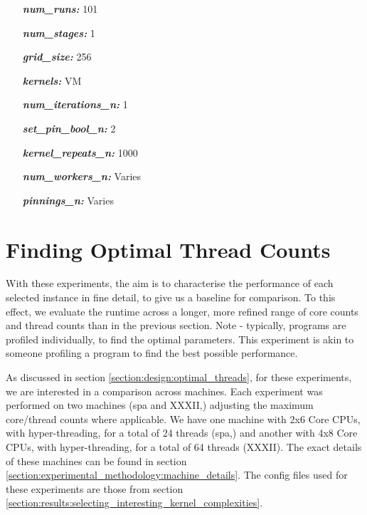 \begin{itemize}
    \begin{itemize}
        \item[\textit{\textbf{num\_runs:}}] 101
        
        \item[\textit{\textbf{num\_stages:}}] 1
        
        \item[\textit{\textbf{grid\_size:}}] 256
        
        \item[\textit{\textbf{kernels:}}] VM
        
        \item[\textit{\textbf{num\_iterations\_n:}}] 1
        
        \item[\textit{\textbf{set\_pin\_bool\_n:}}] 2
        
        \item[\textit{\textbf{kernel\_repeats\_n:}}] 1000
        
        \item[\textit{\textbf{num\_workers\_n:}}] Varies
        
        \item[\textit{\textbf{pinnings\_n:}}] Varies
    \end{itemize}
\end{itemize}



\section{Finding Optimal Thread Counts}
\label{section:results:finding_optimal_thread_counts}

With these experiments, the aim is to characterise the performance of each selected instance in fine detail, to give us a baseline for comparison. To this effect, we evaluate the runtime across a longer, more refined range of core counts and thread counts than in the previous section. Note - typically, programs are profiled individually, to find the optimal parameters. This experiment is akin to someone profiling a program to find the best possible performance.

As discussed in section \ref{section:design:optimal_threads}, for these experiments, we are interested in a comparison across machines. Each experiment was performed on two machines (spa and XXXII,) adjusting the maximum core/thread counts where applicable. We have one machine with 2x6 Core CPUs, with hyper-threading, for a total of 24 threads (spa,) and another with 4x8 Core CPUs, with hyper-threading, for a total of 64 threads (XXXII). The exact details of these machines can be found in section \ref{section:experimental_methodology:machine_details}. The config files used for these experiments are those from section \ref{section:results:selecting_interesting_kernel_complexities}.



